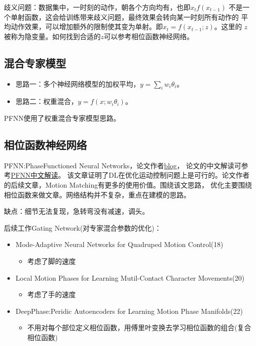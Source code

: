 \documentclass[lang=cn,newtx,10pt,scheme=chinese]{elegantbook}
\begin{document}
歧义问题：数据集中，一时刻的动作，朝各个方向均有，也即$x_tf(x_{t-1})$
不是一个单射函数，这会给训练带来歧义问题，最终效果会转向某一时刻所有动作的
平均动作效果，可以增加额外的限制使其变为单射。即$x_t=f(x_{t-1};z)$。这里的
$z$被称为隐变量。如何找到合适的$z$可以参考相位函数神经网络。

\subsection{混合专家模型}
\begin{itemize}
  \item 思路一：多个神经网络模型的加权平均，$y=\sum_{i}w_i \theta_i$。
  \item 思路二：权重混合，$y=f(x;w_i \theta_i)$。
\end{itemize}

PFNN使用了权重混合专家模型思路。

\subsection{相位函数神经网络}
PFNN:PhaseFunctioned Neural Networks，论文作者\href{https://theorangeduck.com/page/projects}{blog}，
论文的中文解读可参考\href{https://blog.csdn.net/zb1165048017/article/details/103990505}{PFNN中文解读}。
该文章证明了DL在优化运动控制问题上是可行的。论文作者的后续文章，Motion Matching有更多的使用价值。围绕该文思路，
优化主要围绕相位函数来做文章。网络结构并不复杂，重点在建模的思路。

缺点：细节无法复现，急转弯没有减速，调头。

后续工作Gating Network(对专家混合参数的优化)：
\begin{itemize}
  \setlength{\itemindent}{2em}
  \item Mode-Adaptive Neural Networks for Quadruped Motion Control(18)
  \begin{itemize}
    \item 考虑了脚的速度
  \end{itemize}
  \item Local Motion Phases for Learning Mutil-Contact Character Movements(20)
  \begin{itemize}
    \item 考虑了手的速度
  \end{itemize}
  \item DeepPhase:Peridic Autoencoders for Learning Motion Phase Manifolds(22)
  \begin{itemize}
    \item 不用对每个部位定义相位函数，用傅里叶变换去学习相位函数的组合(复合相位函数)
  \end{itemize}
\end{itemize}
\end{document}
